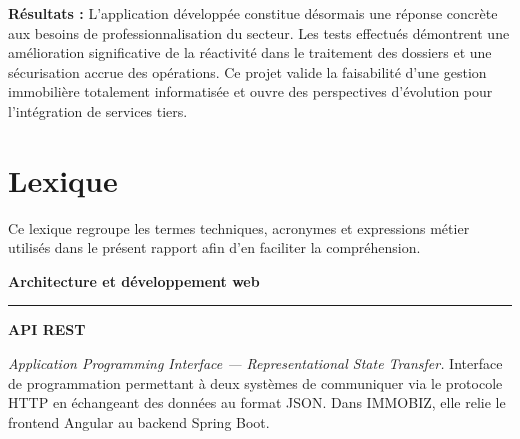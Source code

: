 \documentclass[12pt,a4paper]{report}
\begin{document}
\vspace{0.4cm}

\begin{infobox}
\textbf{Résultats :} L'application développée constitue désormais une réponse concrète aux besoins de professionnalisation du secteur. Les tests effectués démontrent une amélioration significative de la réactivité dans le traitement des dossiers et une sécurisation accrue des opérations. Ce projet valide la faisabilité d'une gestion immobilière totalement informatisée et ouvre des perspectives d'évolution pour l'intégration de services tiers.
\end{infobox}

\vspace{0.6cm}



\newpage

\chapter*{Lexique}

\begin{infobox}
Ce lexique regroupe les termes techniques, acronymes et expressions métier utilisés dans le présent rapport afin d'en faciliter la compréhension.
\end{infobox}

\vspace{0.8cm}

{\Large\textcolor{marine}{\textbf{Architecture et développement web}}}

\vspace{0.2cm}
{\textcolor{grismoyen}{\rule{\textwidth}{0.4pt}}}

\vspace{0.6cm}

\begin{infobox}
\textbf{API REST}

\textit{Application Programming Interface — Representational State Transfer.} Interface de programmation permettant à deux systèmes de communiquer via le protocole HTTP en échangeant des données au format JSON. Dans IMMOBIZ, elle relie le frontend Angular au backend Spring Boot.
\end{infobox}
\end{document}
